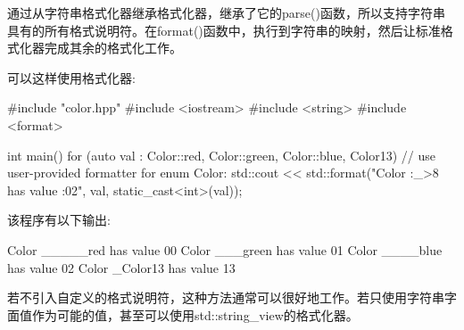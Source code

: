 通过从字符串格式化器继承格式化器，继承了它的parse()函数，所以支持字符串具有的所有格式说明符。在format()函数中，执行到字符串的映射，然后让标准格式化器完成其余的格式化工作。

可以这样使用格式化器:


\begin{cpp}
#include "color.hpp"
#include <iostream>
#include <string>
#include <format>

int main()
{
	for (auto val : {Color::red, Color::green, Color::blue, Color{13}}) {
		// use user-provided formatter for enum Color:
		std::cout << std::format("Color {:_>8} has value {:02}\n",
								  val, static_cast<int>(val));
	}
}
\end{cpp}

该程序有以下输出:

\begin{shell}
Color _____red has value 00
Color ___green has value 01
Color ____blue has value 02
Color _Color13 has value 13
\end{shell}

若不引入自定义的格式说明符，这种方法通常可以很好地工作。若只使用字符串字面值作为可能的值，甚至可以使用std::string\_view的格式化器。




